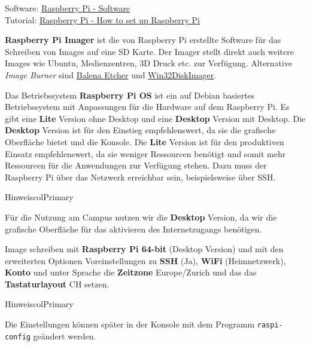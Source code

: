 \documentclass[
  11pt,
  a4paperpaper,
  oneside, openany  ,captions=tableheading
]{scrbook}
\theoremstyle{definition}
\theoremstyle{remark}
\begin{document}
Software: \href{https://www.raspberrypi.com/software}{Raspberry Pi -
Software}\\
Tutorial:
\href{https://www.raspberrypi.com/tutorials/how-to-set-up-raspberry-pi}{Raspberry
Pi - How to set up Raspberry Pi}

\textbf{Raspberry Pi Imager} ist die von
Raspberry Pi erstellte Software für das Schreiben von Images auf eine SD
Karte. Der Imager stellt direkt auch weitere Images wie Ubuntu,
Medienzentren, 3D Druck etc. zur Verfügung. Alternative \emph{Image
Burner} sind \href{https://www.balena.io/etcher}{Balena Etcher} und
\href{https://sourceforge.net/projects/win32diskimager/}{Win32DiskImager}.

Das Betriebssystem \textbf{Raspberry Pi OS} ist
ein auf Debian basiertes Betriebssystem mit Anpassungen für die Hardware
auf dem Raspberry Pi. Es gibt eine \textbf{Lite} Version ohne Desktop
und eine \textbf{Desktop} Version mit Desktop. Die \textbf{Desktop}
Version ist für den Einstieg empfehlenswert, da sie die grafische
Oberfläche bietet und die Konsole. Die \textbf{Lite} Version ist für den
produktiven Einsatz empfehlenswert, da sie weniger Ressourcen benötigt
und somit mehr Ressourcen für die Anwendungen zur Verfügung stehen. Dazu
muss der Raspberry Pi über das Netzwerk erreichbar sein, beispielsweise
über SSH.

\begin{boxtitle}{Hinweis}{colPrimary}

Für die Nutzung am Campus nutzen wir die \textbf{Desktop} Version, da
wir die grafische Oberfläche für das aktivieren des Internetzugangs
benötigen.

\end{boxtitle}

Image schreiben mit \textbf{Raspberry Pi 64-bit} (Desktop Version) und
mit den erweiterten Optionen Voreinstellungen zu \textbf{SSH} (Ja),
\textbf{WiFi} (Heimnetzwerk), \textbf{Konto} und unter Sprache die
\textbf{Zeitzone} Europe/Zurich und das das \textbf{Tastaturlayout} CH
setzen.

\begin{boxtitle}{Hinweis}{colPrimary}

Die Einstellungen können später in der Konsole mit dem Programm
\texttt{raspi-config} geändert werden.

\end{boxtitle}
\end{document}
